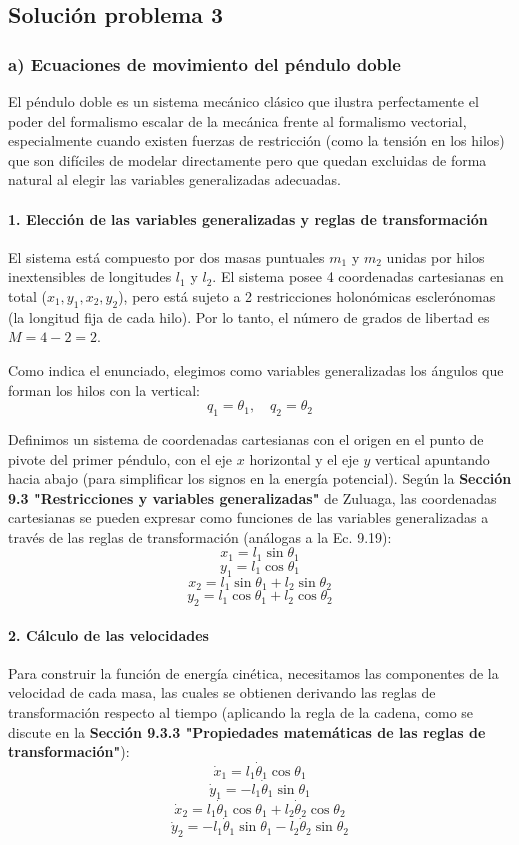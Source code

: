 \documentclass[a4paper]{article}
\begin{document}
\subsection{Solución problema 3}

\subsubsection*{a) Ecuaciones de movimiento del péndulo doble}

El péndulo doble es un sistema mecánico clásico que ilustra perfectamente el poder del formalismo escalar de la mecánica frente al formalismo vectorial, especialmente cuando existen fuerzas de restricción (como la tensión en los hilos) que son difíciles de modelar directamente pero que quedan excluidas de forma natural al elegir las variables generalizadas adecuadas.

\paragraph{1. Elección de las variables generalizadas y reglas de transformación}
El sistema está compuesto por dos masas puntuales $m_1$ y $m_2$ unidas por hilos inextensibles de longitudes $l_1$ y $l_2$. El sistema posee 4 coordenadas cartesianas en total ($x_1, y_1, x_2, y_2$), pero está sujeto a 2 restricciones holonómicas esclerónomas (la longitud fija de cada hilo). Por lo tanto, el número de grados de libertad es $M = 4 - 2 = 2$. 

Como indica el enunciado, elegimos como variables generalizadas los ángulos que forman los hilos con la vertical:
$$q_1 = \theta_1, \quad q_2 = \theta_2$$

Definimos un sistema de coordenadas cartesianas con el origen en el punto de pivote del primer péndulo, con el eje $x$ horizontal y el eje $y$ vertical apuntando hacia abajo (para simplificar los signos en la energía potencial). Según la \textbf{Sección 9.3 "Restricciones y variables generalizadas"} de Zuluaga, las coordenadas cartesianas se pueden expresar como funciones de las variables generalizadas a través de las reglas de transformación (análogas a la Ec. 9.19):
$$x_1 = l_1 \sin\theta_1$$
$$y_1 = l_1 \cos\theta_1$$
$$x_2 = l_1 \sin\theta_1 + l_2 \sin\theta_2$$
$$y_2 = l_1 \cos\theta_1 + l_2 \cos\theta_2$$

\paragraph{2. Cálculo de las velocidades}
Para construir la función de energía cinética, necesitamos las componentes de la velocidad de cada masa, las cuales se obtienen derivando las reglas de transformación respecto al tiempo (aplicando la regla de la cadena, como se discute en la \textbf{Sección 9.3.3 "Propiedades matemáticas de las reglas de transformación"}):
$$\dot{x}_1 = l_1 \dot{\theta}_1 \cos\theta_1$$
$$\dot{y}_1 = -l_1 \dot{\theta}_1 \sin\theta_1$$
$$\dot{x}_2 = l_1 \dot{\theta}_1 \cos\theta_1 + l_2 \dot{\theta}_2 \cos\theta_2$$
$$\dot{y}_2 = -l_1 \dot{\theta}_1 \sin\theta_1 - l_2 \dot{\theta}_2 \sin\theta_2$$
\end{document}
